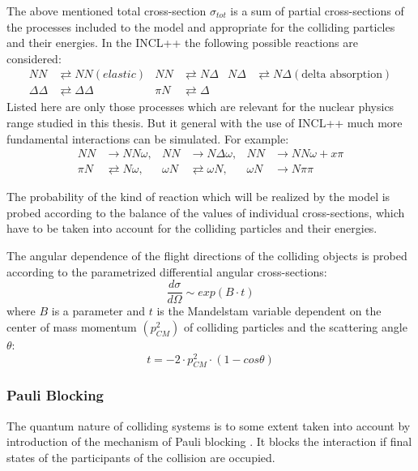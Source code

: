 The above mentioned total cross-section $\sigma_{tot}$ is a sum of partial cross-sections of the processes included to the model 
and appropriate for the colliding particles and their energies.
In the INCL++ the following possible reactions are considered:
\begin{align*}
	NN & \rightleftarrows NN (elastic) &  NN & \rightleftarrows  N\Delta& N\Delta & \rightleftarrows N\Delta  (\text{delta absorption})\\
	\Delta\Delta & \rightleftarrows \Delta\Delta & \pi N & \rightleftarrows \Delta& & 
\end{align*}
Listed here are only those processes which are relevant for the nuclear physics range studied in this thesis. 
But it general with the use of INCL++
much more fundamental interactions can be simulated. For example: 
{%
	\begin{align*}
		NN &\rightarrow NN\omega,&NN&\rightarrow N\Delta\omega , &NN&\rightarrow NN\omega + x\pi\\
		\pi N&\rightleftarrows N\omega, &\omega N&\rightleftarrows \omega N, &\omega N&\rightarrow N\pi\pi 
	\end{align*}
}

The probability of the kind of reaction which will be realized by the model is probed according to the balance of the values of individual cross-sections, which have to be taken into account for the colliding particles and their energies.

The angular dependence of the flight directions of the colliding objects is probed according to the parametrized 
differential angular cross-sections: 
\begin{equation}
\frac{d\sigma}{d\Omega} \sim exp(B \cdot t)
\end{equation}
where $B$ is a parameter and $t$ is the Mandelstam variable dependent on the center of mass momentum $(p^{2}_{CM})$ 
of colliding particles and the scattering angle $\theta$:
\begin{equation}
t = - 2 \cdot p^{2}_{CM} \cdot (1 - cos\theta) 
\end{equation}


\subsubsection{Pauli Blocking}

The quantum nature of colliding systems is to some extent taken into account by introduction of the mechanism of Pauli blocking \cite{INCLboudard2002intranuclear}.
It blocks the interaction if final states of the participants of the collision are occupied.

